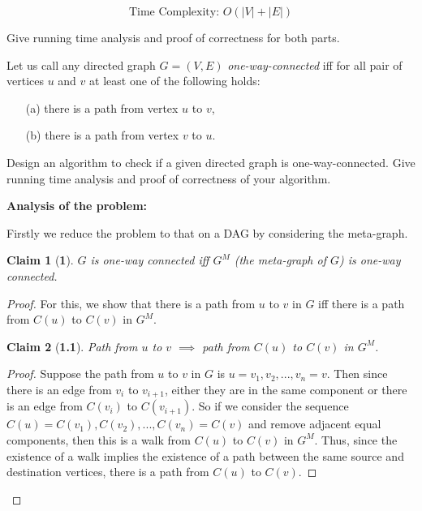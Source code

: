 \documentclass[answers]{exam}
\newtheorem*{claim}{Claim}
\begin{document}
\begin{questions}
\begin{parts}
\begin{solution}
\[
    \text{Time Complexity: } O (|V| + |E|)
\]

\end{solution}


\end{parts}

Give running time analysis and proof of correctness for both parts.

\vspace{0.3in}

 
\question[20] Let us call any directed graph $G=(V, E)$ {\em one-way-connected} iff for all pair of vertices $u$ and $v$ at least one of the following holds: 
\begin{enumerate}
\item[(a)] there is a path from vertex $u$ to $v$,
\item[(b)] there is a path from vertex $v$ to $u$.
\end{enumerate}

Design an algorithm to check if a given directed graph is one-way-connected. Give running time analysis and proof of correctness of your algorithm.

\begin{solution}

\textbf{Analysis of the problem:}

Firstly we reduce the problem to that on a DAG by considering the meta-graph.

\begin{claim}[\textbf{1}] $G$ is one-way connected iff $G^M$ (the meta-graph of $G$) is one-way connected.
\end{claim}
\begin{proof}
For this, we show that there is a path from $u$ to $v$ in $G$ iff there is a path from $C(u)$ to $C(v)$ in $G^M$.

\begin{claim}[\textbf{1.1}]Path from $u$ to $v$ $\implies$ path from $C(u)$ to $C(v)$ in $G^M$.
\end{claim}
\begin{proof}
Suppose the path from $u$ to $v$ in $G$ is $u = v_1, v_2, ..., v_n = v$. Then since there is an edge from $v_i$ to $v_{i + 1}$, either they are in the same component or there is an edge from $C(v_i)$ to $C(v_{i + 1})$. So if we consider the sequence $C(u) = C(v_1), C(v_2), ..., C(v_n) = C(v)$ and remove adjacent equal components, then this is a walk from $C(u)$ to $C(v)$ in $G^M$. Thus, since the existence of a walk implies the existence of a path between the same source and destination vertices, there is a path from $C(u)$ to $C(v)$.
\end{proof} 


\end{proof}
\end{solution}
\end{questions}
\end{document}
